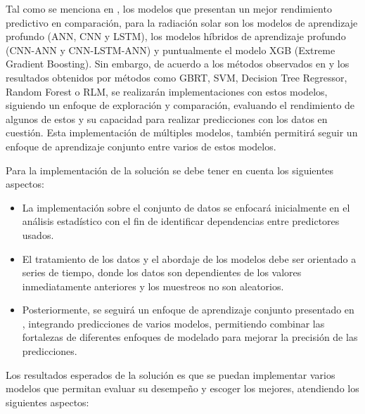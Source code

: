 \documentclass[a4paper]{article}
\begin{document}
Tal como se menciona en \cite{ref:comprehensiveassessment}, los modelos que presentan un mejor rendimiento predictivo en comparación, para la radiación solar son los modelos de aprendizaje profundo (ANN, CNN y LSTM), los modelos híbridos de aprendizaje profundo (CNN-ANN y CNN-LSTM-ANN) y puntualmente el modelo XGB (Extreme Gradient Boosting). Sin embargo, de acuerdo a los métodos observados en \cite{ref:solirrfor} y los resultados obtenidos por métodos como GBRT, SVM, Decision Tree Regressor, Random Forest o RLM, se realizarán implementaciones con estos modelos, siguiendo un enfoque de exploración y comparación, evaluando el rendimiento de algunos de estos y su capacidad para realizar predicciones con los datos en cuestión. Esta implementación de múltiples modelos, también permitirá seguir un enfoque de aprendizaje conjunto entre varios de estos modelos.

Para la implementación de la solución se debe tener en cuenta los siguientes aspectos:

\begin{itemize}
    \item La implementación sobre el conjunto de datos se enfocará inicialmente en el análisis estadístico con el fin de identificar dependencias entre predictores usados.
    \item El tratamiento de los datos y el abordaje de los modelos debe ser orientado a series de tiempo, donde los datos son dependientes de los valores inmediatamente anteriores y los muestreos no son aleatorios.
    \item Posteriormente, se seguirá un enfoque de aprendizaje conjunto presentado en \cite{ref:solirrfor}, integrando predicciones de varios modelos, permitiendo combinar las fortalezas de diferentes enfoques de modelado para mejorar la precisión de las predicciones.
\end{itemize}

Los resultados esperados de la solución es que se puedan implementar varios modelos que permitan evaluar su desempeño y escoger los mejores, atendiendo los siguientes aspectos:
\end{document}
